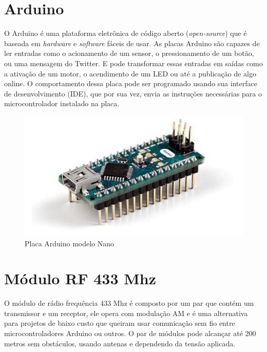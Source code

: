 \documentclass[
	12pt,				%
	openright,			%
	oneside,			%
	a4paper,			%
	english,			%
	brazil				%
	]{abntex2}
\begin{document}
		\section{Arduino}
		O Arduino é uma plataforma eletrônica de código aberto (\textit{open-source}) que é baseada em \textit{hardware} e \textit{software} fáceis de usar. As placas Arduino são capazes de ler entradas como o acionamento de um sensor, o pressionamento de um botão, ou uma mensagem do Twitter. E pode transformar essas entradas em saídas como a ativação de um motor, o acendimento de um LED ou até a publicação de algo online. O comportamento dessa placa pode ser programado usando sua interface de desenvolvimento (IDE), que por sua vez, envia as instruções necessárias para o microcontrolador instalado na placa.\cite{arduinosite}
		
		\begin{figure}[h!]
			\centering
  		\includegraphics[scale=0.7]{./figures/arduino-nano1.jpg}
			\caption{Placa Arduino modelo Nano \cite{arduinonanosite}}
  		\label{Fig:arduino-nano1}
		\end{figure}

		\section{Módulo RF 433 Mhz}
		O módulo de rádio frequência 433 Mhz é composto por um par que contém um transmissor e um receptor, ele opera com modulação AM e é uma alternativa para projetos de baixo custo que queiram usar comunicação sem fio entre microcontroladores Arduino ou outros. O par de módulos pode alcançar até 200 metros sem obstáculos, usando antenas e dependendo da tensão aplicada.\cite{institutodigitalrf}


	
\end{document}
